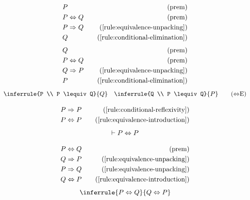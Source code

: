\begin{align*}
    & \hspace{0em} P & \quad (\text{prem})\\
    & \hspace{0em} P \Leftrightarrow Q & \quad (\text{prem})\\
    & \hspace{0em} P \Rightarrow Q & \quad (\text{\ref{rule:equivalence-unpacking}})\\
    & \hspace{0em} Q & \quad (\text{\ref{rule:conditional-elimination}})\\
\end{align*}
\begin{align*}
    & \hspace{0em} Q & \quad (\text{prem})\\
    & \hspace{0em} P \Leftrightarrow Q & \quad (\text{prem})\\
    & \hspace{0em} Q \Rightarrow P & \quad (\text{\ref{rule:equivalence-unpacking}})\\
    & \hspace{0em} P & \quad (\text{\ref{rule:conditional-elimination}})\\
\end{align*}
\begin{equation}
    \inferrule{P \\ P \lequiv Q}{Q} \quad \inferrule{Q \\ P \lequiv Q}{P}
    \tag{{$\lequiv$}E}
    \label{rule:equivalence-elimination}
\end{equation}

\begin{align*}
    & \hspace{0em} P \Rightarrow P & \quad (\text{\ref{rule:conditional-reflexivity}})\\
    & \hspace{0em} P \Leftrightarrow P & \quad (\text{\ref{rule:equivalence-introduction}})
\end{align*}
\begin{equation}
    \vdash P \Leftrightarrow P
    \label{rule:equivalence-reflexivity}
\end{equation}

\begin{align*}
    & \hspace{0em} P \Leftrightarrow Q & \quad (\text{prem})\\
    & \hspace{0em} Q \Rightarrow P & \quad (\text{\ref{rule:equivalence-unpacking}})\\
    & \hspace{0em} P \Rightarrow Q & \quad (\text{\ref{rule:equivalence-unpacking}})\\
    & \hspace{0em} Q \Leftrightarrow P & \quad (\text{\ref{rule:equivalence-introduction}})
\end{align*}
\begin{equation}
    \inferrule{P \lequiv Q}{Q \lequiv P}
    \label{rule:equivalence-symmetry}
\end{equation}

